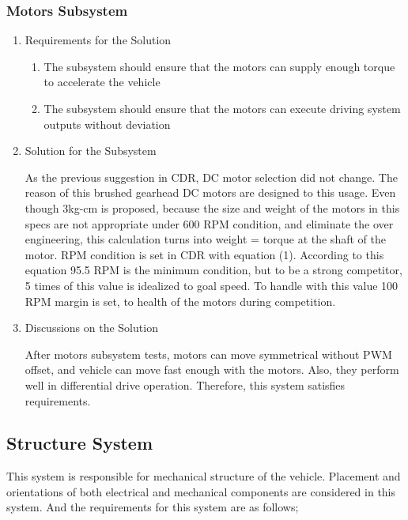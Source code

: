 \documentclass[a4paper,12pt]{article}
\begin{document}
	
		
	
	\subsubsection{Motors Subsystem}
	
		\begin{enumerate}
			\item {Requirements for the Solution}
			
			\begin{enumerate}
						\item The subsystem should ensure that the motors can supply enough torque to accelerate the vehicle 
		\item The subsystem should ensure that the motors can execute driving system outputs without deviation
					\end{enumerate} 
					
			\item {Solution for the Subsystem}
			
			As the previous suggestion in CDR, DC motor selection did not change. The reason of this brushed gearhead DC motors are designed to this usage. Even though 3kg-cm is proposed, because the size and weight of the motors in this specs are not appropriate under 600 RPM condition, and eliminate the over engineering, this calculation turns into weight = torque at the shaft of the motor. RPM condition is set in CDR with equation (1). According to this equation 95.5 RPM is the minimum condition, but to be a strong competitor, 5 times of this value is idealized to goal speed. To handle with this value 100 RPM margin is set, to health of the motors during competition.   
   

			
			\item {Discussions on the Solution}
			
			After motors subsystem tests, motors can move symmetrical without PWM offset, and vehicle can move fast enough with the motors. Also, they perform well in differential drive operation. Therefore, this system satisfies requirements. 
			
		\end{enumerate}	
	
	
	
	
	\subsection{Structure System}
		
		This system is responsible for mechanical structure of the vehicle. Placement and orientations of both electrical and mechanical components are considered in this system. And the requirements for this system are as follows;
		
\end{document}
